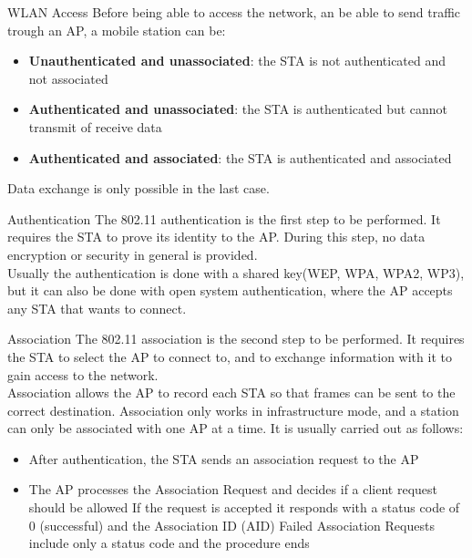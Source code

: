 \begin{section}{WLAN Access}
  Before being able to access the network, an be able to send traffic trough an AP, a 
  mobile station can be:
  \begin{itemize}
    \item \textbf{Unauthenticated and unassociated}: the STA is not authenticated and not associated
    \item \textbf{Authenticated and unassociated}: the STA is authenticated but cannot transmit of receive 
      data
    \item \textbf{Authenticated and associated}: the STA is authenticated and associated
  \end{itemize}
  Data exchange is only possible in the last case.
  \begin{paragraph}{Authentication}
    The 802.11 authentication is the first step to be performed. It requires the STA to prove its identity
    to the AP. During this step, no data encryption or security in general is provided.\\
    Usually the authentication is done with a shared key(WEP, WPA, WPA2, WP3), but it can also be 
    done with open system authentication, where the AP accepts any STA that wants to connect.\\
  \end{paragraph}
  \begin{paragraph}{Association}
    The 802.11 association is the second step to be performed. It requires the STA to select the AP to connect to,
    and to exchange information with it to gain access to the network.\\
    Association allows the AP to record each STA so that frames can be sent to the correct destination.
    Association only works in infrastructure mode, and a station can only be associated with one AP at a time.
    It is usually carried out as follows:
    \begin{itemize}
      \item After authentication, the STA sends an association request to the AP
      \item The AP processes the Association Request and decides if a client request should be allowed
        \subitem If the request is accepted it responds with a status code of 0 (successful) and the 
        Association ID (AID)
        \subitem Failed Association Requests include only a status code and the procedure ends
    \end{itemize}
  \end{paragraph}

\end{section}
